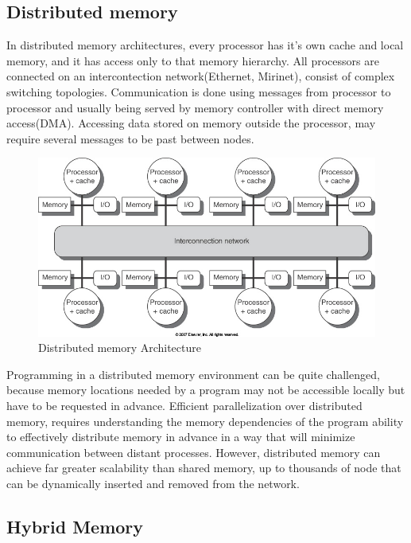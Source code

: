 \subsection{Distributed memory}

In distributed memory architectures, every processor has it's own cache and local memory, and it has access only to that memory hierarchy.  All processors are connected on an intercontection network(Ethernet, Mirinet), consist of complex switching topologies. Communication is done using messages from processor to processor and usually being served by memory controller with direct memory access(DMA). Accessing data stored on memory outside the processor, may require several messages to be past between nodes.


\begin{figure}
 \centering
  \includegraphics[scale=0.4]{distributed_memory.jpg}
\caption{Distributed memory Architecture}
\label{Distributed memory architecture}
\end{figure}
Programming in a distributed memory environment can be quite challenged, because memory locations needed by a program may not be accessible locally but have to be requested in advance. Efficient parallelization over distributed memory, requires understanding the memory dependencies of the program ability to effectively distribute memory in advance in a way that will minimize communication between distant processes. However, distributed memory can achieve far greater scalability than shared memory, up to thousands of node that can be dynamically inserted and removed from the network.

\subsection{Hybrid Memory}

